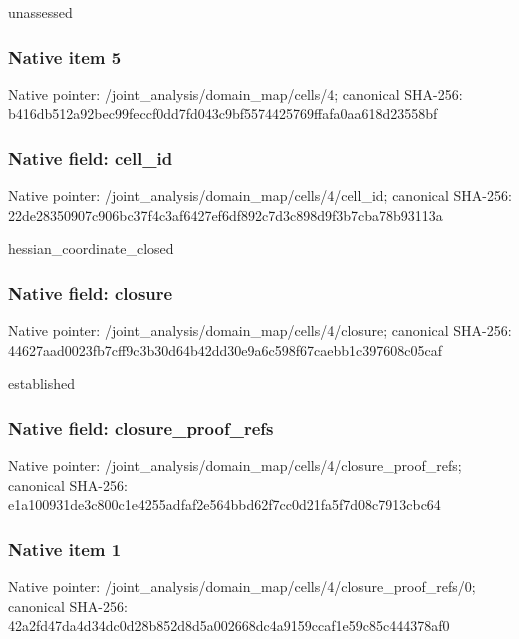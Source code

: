 \documentclass[10pt,a4paper]{article}
\begin{document}
\begingroup\raggedright\sloppy unassessed\par\endgroup

\subsubsection{Native item 5}
Native pointer: /joint\_\allowbreak{}analysis/domain\_\allowbreak{}map/cells/4; canonical SHA-256: b416db512a92bec99feccf0dd7fd043c9bf5574425769ffafa0aa618d23558bf

\subsubsection{Native field: cell\_\allowbreak{}id}
Native pointer: /joint\_\allowbreak{}analysis/domain\_\allowbreak{}map/cells/4/cell\_\allowbreak{}id; canonical SHA-256: 22de28350907c906bc37f4c3af6427ef6df892c7d3c898d9f3b7cba78b93113a

\begingroup\raggedright\sloppy hessian\_\allowbreak{}coordinate\_\allowbreak{}closed\par\endgroup

\subsubsection{Native field: closure}
Native pointer: /joint\_\allowbreak{}analysis/domain\_\allowbreak{}map/cells/4/closure; canonical SHA-256: 44627aad0023fb7cff9c3b30d64b42dd30e9a6c598f67caebb1c397608c05caf

\begingroup\raggedright\sloppy established\par\endgroup

\subsubsection{Native field: closure\_\allowbreak{}proof\_\allowbreak{}refs}
Native pointer: /joint\_\allowbreak{}analysis/domain\_\allowbreak{}map/cells/4/closure\_\allowbreak{}proof\_\allowbreak{}refs; canonical SHA-256: e1a100931de3c800c1e4255adfaf2e564bbd62f7cc0d21fa5f7d08c7913cbc64

\subsubsection{Native item 1}
Native pointer: /joint\_\allowbreak{}analysis/domain\_\allowbreak{}map/cells/4/closure\_\allowbreak{}proof\_\allowbreak{}refs/0; canonical SHA-256: 42a2fd47da4d34dc0d28b852d8d5a002668dc4a9159ccaf1e59c85c444378af0
\end{document}
